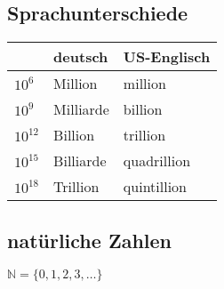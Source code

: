 \subsection{Sprachunterschiede}
\begin{tabular}{|l|l|l|} \hline
& deutsch   & US-Englisch \\ \hline \hline
$10^6$    & Million   & million     \\ \hline
$10^9$    & Milliarde & billion     \\ \hline
$10^{12}$ & Billion   & trillion    \\ \hline
$10^{15}$ & Billiarde & quadrillion \\ \hline
$10^{18}$ & Trillion  & quintillion \\ \hline
\end{tabular}
\subsection{natürliche Zahlen}
$\mathbb{N} = \lbrace 0, 1, 2, 3, \dots \rbrace$
